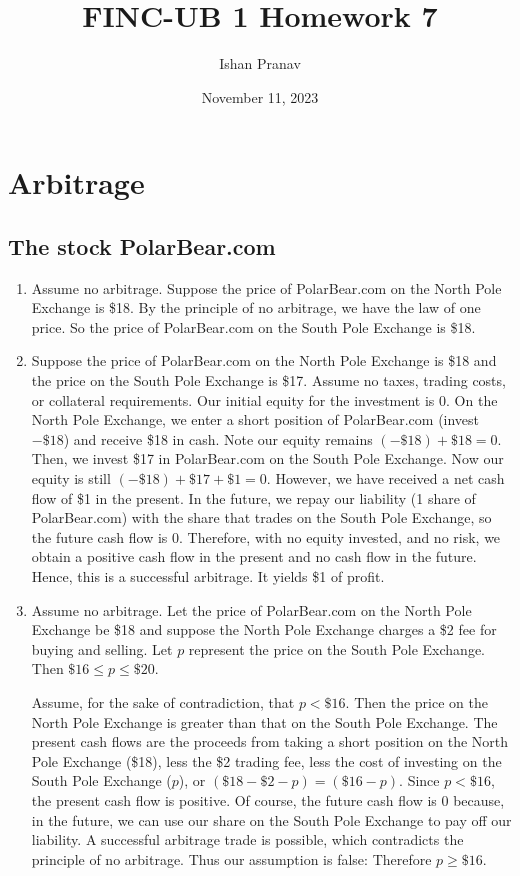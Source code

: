 \documentclass[12pt]{article}
\title{FINC-UB 1 Homework 7}
\author{Ishan Pranav}
\date{November 11, 2023}
\begin{document}
\maketitle
\section{Arbitrage}
\subsection{The stock PolarBear.com}
\begin{enumerate}
\item Assume no arbitrage. Suppose the price of PolarBear.com on the North Pole Exchange is \$18. By the principle of no arbitrage, we have the law of one price. So the price of PolarBear.com on the South Pole Exchange is \$18.
\item Suppose the price of PolarBear.com on the North Pole Exchange is \$18 and the price on the South Pole Exchange is \$17. Assume no taxes, trading costs, or collateral requirements. Our initial equity for the investment is 0. On the North Pole Exchange, we enter a short position of PolarBear.com (invest $-\$18$) and receive \$18 in cash. Note our equity remains $(-\$18)+\$18=0$. Then, we invest \$17 in PolarBear.com on the South Pole Exchange. Now our equity is still $(-\$18)+\$17+\$1=0$. However, we have received a net cash flow of \$1 in the present. In the future, we repay our liability (1 share of PolarBear.com) with the share that trades on the South Pole Exchange, so the future cash flow is 0. Therefore, with no equity invested, and no risk, we obtain a positive cash flow in the present and no cash flow in the future. Hence, this is a successful arbitrage. It yields \$1 of profit.
\item Assume no arbitrage. Let the price of PolarBear.com on the North Pole Exchange be \$18 and suppose the North Pole Exchange charges a \$2 fee for buying and selling. Let $p$ represent the price on the South Pole Exchange. Then $\$16\leq p\leq\$20$. 

Assume, for the sake of contradiction, that $p<\$16$. Then the price on the North Pole Exchange is greater than that on the South Pole Exchange. The present cash flows are the proceeds from taking a short position on the North Pole Exchange (\$18), less the \$2 trading fee, less the cost of investing on the South Pole Exchange ($p$), or $(\$18-\$2-p)=(\$16-p)$. Since $p<\$16$, the present cash flow is positive. Of course, the future cash flow is 0 because, in the future, we can use our share on the South Pole Exchange to pay off our liability. A successful arbitrage trade is possible, which contradicts the principle of no arbitrage. Thus our assumption is false: Therefore $p\geq\$16$.


\end{enumerate}
\end{document}
